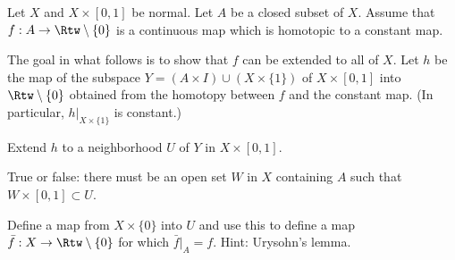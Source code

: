 Let $X$ and $X\times [0,1]$ be normal. Let $A$ be a closed subset of
$X$. Assume that $f:A\rightarrow \Rtw\setminus \{0\}$ is a continuous
map which is homotopic to a constant map. 

The goal in what follows is to show that $f$ can be extended to all of
$X$. Let $h$ be the map of the subspace $Y=(A\times I)\cup (X\times
\{1\})$ of $X\times [0,1]$ into $\Rtw\setminus \{0\}$ obtained from
the homotopy between $f$ and the constant map. (In particular,
$h|_{X\times \{1\}}$ is constant.)
\begin{alist}
\item Extend $h$ to a neighborhood $U$ of $Y$ in $X\times [0,1]$.
\item True or false: there must be an open set $W$ in $X$ containing
$A$ such that $W\times [0,1]\subset U$.
\item Define a map from $X\times \{0\}$ into $U$ and use this to
define a map $\bar{f}:X\rightarrow \Rtw\setminus \{0\}$ for which
$\bar{f}|_{A}=f$. Hint: Urysohn's lemma.
\end{alist}
